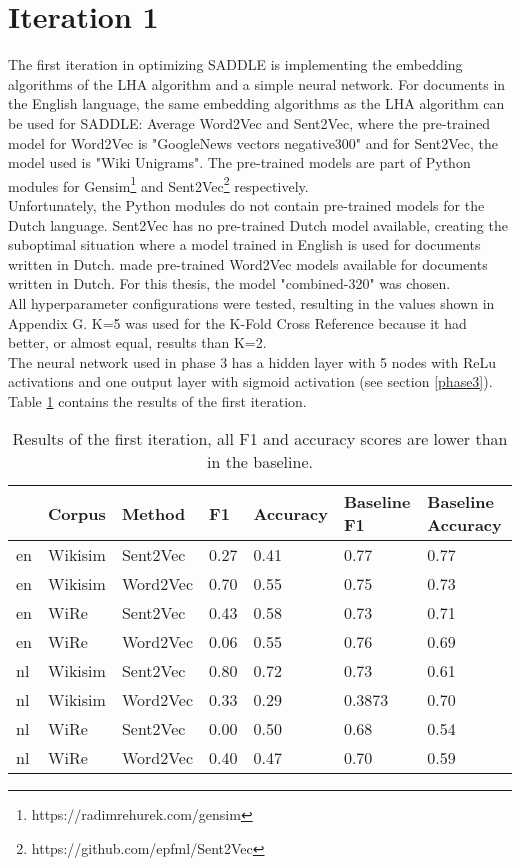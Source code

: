 {\section{Iteration 1}
\label{resultsIteration1}
The first iteration in optimizing SADDLE is implementing the embedding algorithms of the LHA algorithm and a simple neural network. For documents in the English language, the same embedding algorithms as the LHA algorithm can be used for SADDLE: Average Word2Vec and Sent2Vec, where the pre-trained model for Word2Vec is "GoogleNews vectors negative300" and for Sent2Vec, the model used is "Wiki Unigrams". The pre-trained models are part of Python modules for Gensim\footnote{https://radimrehurek.com/gensim} and Sent2Vec\footnote{https://github.com/epfml/Sent2Vec} respectively.\\

Unfortunately, the Python modules do not contain pre-trained models for the Dutch language. Sent2Vec has no pre-trained Dutch model available, creating the suboptimal situation where a model trained in English is used for documents written in Dutch. \citet{nlWord2Vec} made pre-trained Word2Vec models available for documents written in Dutch. For this thesis, the model "combined-320" was chosen.\\

All hyperparameter configurations were tested, resulting in the values shown in Appendix G. K=5 was used for the K-Fold Cross Reference because it had better, or almost equal, results than K=2.\\

The neural network used in phase 3 has a hidden layer with 5 nodes with ReLu activations and one output layer with sigmoid activation (see section \ref{phase3}). Table \ref{tabFirstIteration} contains the results of the first iteration. 
 \begin{table}[!ht]
    \centering
    \captionsetup{justification=centering}
    \begin{tabular}{l|l|l|l|l|l|l}
    \hline
        \textbf{} & \textbf{Corpus} & \textbf{Method} &  \textbf{F1} & \textbf{Accuracy} & \textbf{Baseline F1} & \textbf{Baseline Accuracy} \\ \hline
en & Wikisim & Sent2Vec & 0.27 & 0.41 & 0.77 & 0.77 \\ \hline
en & Wikisim & Word2Vec &  0.70 & 0.55 & 0.75 & 0.73 \\ \hline
en & WiRe & Sent2Vec & 0.43 & 0.58 & 0.73 & 0.71 \\ \hline
en & WiRe & Word2Vec &  0.06 & 0.55 & 0.76 & 0.69 \\ \hline
nl & Wikisim & Sent2Vec &  0.80 & 0.72 & 0.73 & 0.61 \\ \hline
nl & Wikisim & Word2Vec &  0.33 & 0.29 & 0.3873 & 0.70 \\ \hline
nl & WiRe & Sent2Vec & 0.00 & 0.50 & 0.68 & 0.54 \\ \hline
nl & WiRe & Word2Vec &  0.40 & 0.47 & 0.70 & 0.59 \\ \hline
\end{tabular}
    \caption{Results of the first iteration, all F1 and accuracy scores are lower than in the baseline.}
    \label{tabFirstIteration}
\end{table}

}
